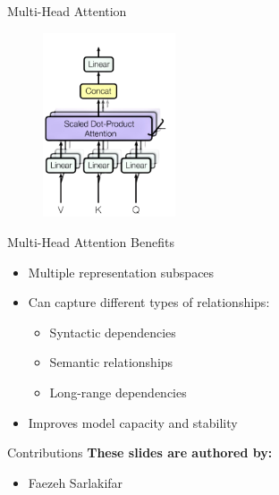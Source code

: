 \documentclass[serif, aspectratio=169]{beamer}
\begin{document}
\begin{frame}{Multi-Head Attention}

    \begin{figure}
        \centering
        \includegraphics[width=0.35\textwidth]{pic/multihead-attention-2.png}
        \label{fig:multihead_attention}
    \end{figure}
\end{frame}

\begin{frame}{Multi-Head Attention Benefits}
    \begin{itemize}
        \item Multiple representation subspaces
        \item Can capture different types of relationships:
        \begin{itemize}
            \item Syntactic dependencies
            \item Semantic relationships
            \item Long-range dependencies
        \end{itemize}
        \item Improves model capacity and stability
    \end{itemize}
\end{frame}

\begin{frame}{Contributions}
	\textbf{These slides are authored by:}
	\begin{itemize}
		\item Faezeh Sarlakifar
	\end{itemize}
	
\end{frame}
\end{document}
